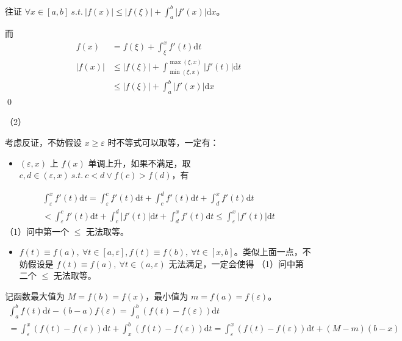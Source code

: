 往证 $\displaystyle \forall x\in [ a,b] \ s.t.\ |f( x) |\leqslant | f( \xi )| +\int _{a}^{b} |f'( x) |\mathrm{d} x$。

而
\begin{equation*}
	\begin{aligned}
		f( x) & =f( \xi ) +\int _{\xi }^{x} f'( t)\mathrm{d} t\\
		|f( x) | & \leqslant |f( \xi ) |+\int _{\min( \xi ,x)}^{\max( \xi ,x)} |f'( t) |\mathrm{d} t\\
		& \leqslant |f( \xi ) |+\int _{a}^{b} |f'( x) |\mathrm{d} x
	\end{aligned}
\end{equation*}
\qed 

（2）

考虑反证，不妨假设 $\displaystyle x\geqslant \varepsilon $ 时不等式可以取等，一定有：
\begin{itemize}
	\item $\displaystyle ( \varepsilon ,x)$ 上 $\displaystyle f( x)$ 单调上升，如果不满足，取 $\displaystyle c,d\in ( \varepsilon ,x) \ s.t.\ c< d\lor f( c)  >f( d)$，有 
\end{itemize}
\begin{gather*}
	\int _{\varepsilon }^{x} f'( t)\mathrm{d} t=\int _{\varepsilon }^{c} f'( t)\mathrm{d} t+\int _{c}^{d} f'( t)\mathrm{d} t+\int _{d}^{x} f'( t)\mathrm{d} t\\
	< \int _{\varepsilon }^{c} f'( t)\mathrm{d} t+\int _{c}^{d} |f'( t) |\mathrm{d} t+\int _{d}^{x} f'( t)\mathrm{d} t\leqslant \int _{\varepsilon }^{x} |f'( t) |\mathrm{d} t
\end{gather*}
	（1）问中第一个 $\displaystyle \leqslant $ 无法取等。
\begin{itemize}
	\item $\displaystyle f( t) \equiv f( a) ,\ \forall t\in [ a,\varepsilon ] ,f( t) \equiv f( b) ,\ \forall t\in [ x,b]$。类似上面一点，不妨假设是 $\displaystyle f( t) \equiv f( a) ,\ \forall t\in ( a,\varepsilon )$ 无法满足，一定会使得 （1）问中第二个 $\displaystyle \leqslant $ 无法取等。
\end{itemize}

记函数最大值为 $\displaystyle M=f( b) =f( x)$，最小值为 $\displaystyle m=f( a) =f( \varepsilon )$。
\begin{gather*}
	\int _{a}^{b} f( t)\mathrm{d} t-( b-a) f( \varepsilon ) =\int _{a}^{b}( f( t) -f( \varepsilon ))\mathrm{d} t\\
	=\int _{\varepsilon }^{x}( f( t) -f( \varepsilon ))\mathrm{d} t+\int _{x}^{b}( f( t) -f( \varepsilon ))\mathrm{d} t=\int _{\varepsilon }^{x}( f( t) -f( \varepsilon ))\mathrm{d} t+( M-m)( b-x)
\end{gather*}

